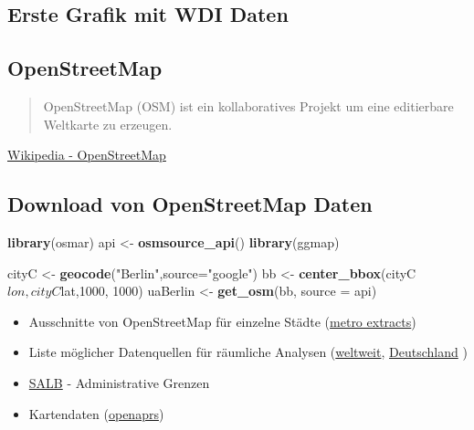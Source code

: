 \documentclass[]{article}
\newenvironment{Shaded}{\begin{snugshade}}{\end{snugshade}}
\newcommand{\KeywordTok}[1]{\textcolor[rgb]{0.13,0.29,0.53}{\textbf{{#1}}}}
\newcommand{\DataTypeTok}[1]{\textcolor[rgb]{0.13,0.29,0.53}{{#1}}}
\newcommand{\DecValTok}[1]{\textcolor[rgb]{0.00,0.00,0.81}{{#1}}}
\newcommand{\StringTok}[1]{\textcolor[rgb]{0.31,0.60,0.02}{{#1}}}
\newcommand{\NormalTok}[1]{{#1}}
\begin{document}
\subsection{Erste Grafik mit WDI
Daten}\label{erste-grafik-mit-wdi-daten}

\subsection{OpenStreetMap}\label{openstreetmap}

\begin{quote}
OpenStreetMap (OSM) ist ein kollaboratives Projekt um eine editierbare
Weltkarte zu erzeugen.
\end{quote}

\href{https://en.wikipedia.org/wiki/OpenStreetMap}{Wikipedia -
OpenStreetMap}

\subsection{Download von OpenStreetMap
Daten}\label{download-von-openstreetmap-daten}

\begin{Shaded}
\begin{Highlighting}[]
\KeywordTok{library}\NormalTok{(osmar)}
\NormalTok{api <-}\StringTok{ }\KeywordTok{osmsource_api}\NormalTok{()}
\KeywordTok{library}\NormalTok{(ggmap)}
\end{Highlighting}
\end{Shaded}

\begin{Shaded}
\begin{Highlighting}[]
\NormalTok{cityC <-}\StringTok{ }\KeywordTok{geocode}\NormalTok{(}\StringTok{"Berlin"}\NormalTok{,}\DataTypeTok{source=}\StringTok{"google"}\NormalTok{)}
\NormalTok{bb <-}\StringTok{ }\KeywordTok{center_bbox}\NormalTok{(cityC$lon,cityC$lat,}\DecValTok{1000}\NormalTok{, }\DecValTok{1000}\NormalTok{)}
\NormalTok{uaBerlin <-}\StringTok{ }\KeywordTok{get_osm}\NormalTok{(bb, }\DataTypeTok{source =} \NormalTok{api)}
\end{Highlighting}
\end{Shaded}

\begin{itemize}
\item
  Ausschnitte von OpenStreetMap für einzelne Städte
  (\href{https://mapzen.com/data/metro-extracts/}{metro extracts})
\item
  Liste möglicher Datenquellen für räumliche Analysen
  (\href{http://wiki.openstreetmap.org/wiki/Potential_Datasources}{weltweit},
  \href{http://wiki.openstreetmap.org/wiki/DE:Potential_Datasources}{Deutschland}
  )
\item
  \href{http://wiki.openstreetmap.org/wiki/SALB}{SALB} - Administrative
  Grenzen
\item
  Kartendaten (\href{http://www.openaprs.net/}{openaprs})
\end{itemize}
\end{document}
